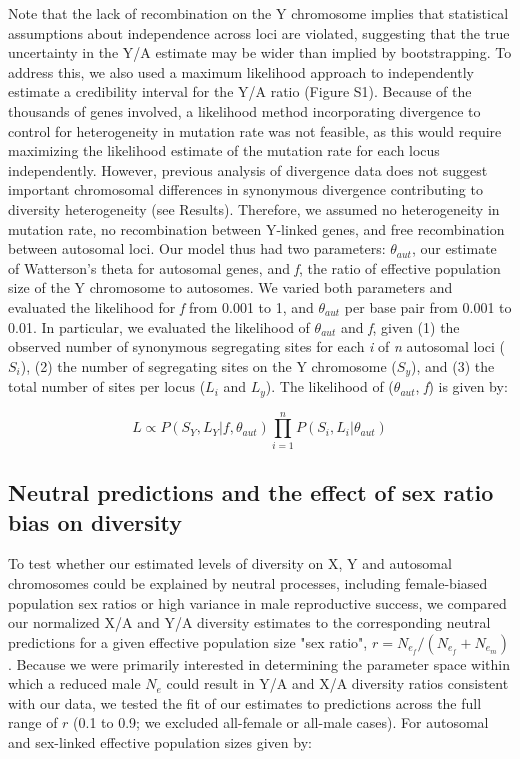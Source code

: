 \documentclass[9pt,twocolumn,twoside,lineno]{gsajnl}
\begin{document}
Note that the lack of recombination on the Y chromosome implies that statistical assumptions about independence across loci are violated, suggesting that the true uncertainty in the Y/A estimate may be wider than implied by bootstrapping. To address this, we also used a maximum likelihood approach \citep{wright2004hka} to independently estimate a credibility interval for the Y/A ratio (Figure S1). Because of the thousands of genes involved, a likelihood method incorporating divergence to control for heterogeneity in mutation rate was not feasible, as this would require maximizing the likelihood estimate of the mutation rate for each locus independently. However, previous analysis of divergence data does not suggest important chromosomal differences in synonymous divergence contributing to diversity heterogeneity (see Results). Therefore, we assumed no heterogeneity in mutation rate, no recombination between Y-linked genes, and free recombination between autosomal loci. Our model thus had two parameters: $\theta_{aut}$, our estimate of Watterson's theta for autosomal genes, and \textit{f}, the ratio of effective population size of the Y chromosome to autosomes. We varied both parameters and evaluated the likelihood for \textit{f} from 0.001 to 1, and $\theta_{aut}$ per base pair from 0.001 to 0.01. In particular, we evaluated the likelihood of $\theta_{aut}$ and \textit{f}, given (1) the observed number of synonymous segregating sites for each \textit{i} of \textit{n} autosomal loci ($S_{i}$), (2) the number of segregating sites on the Y chromosome ($S_{y}$), and (3) the total number of sites per locus ($L_{i}$ and $L_{y}$). The likelihood of ($\theta_{aut}$, \textit{f}) is given by:

\begin{equation}
  L \propto  P(S_{Y}, L_{Y} | f, \theta_{aut})\prod_{i=1}^{n}P(S_{i}, L_{i} | \theta_{aut}) \label{eq:L}
\end{equation}

\subsection*{Neutral predictions and the effect of sex ratio bias on diversity}
To test whether our estimated levels of diversity on X, Y and autosomal chromosomes could be explained by neutral processes, including female-biased population sex ratios or high variance in male reproductive success, we compared our normalized X/A and Y/A diversity estimates to the corresponding neutral predictions for a given effective population size "sex ratio", $r=N_{e_{f}}/(N_{e_{f}} + N_{e_{m}})$. Because we were primarily interested in determining the parameter space within which a reduced male $N_{e}$ could result in Y/A and X/A diversity ratios consistent with our data, we tested the fit of our estimates to predictions across the full range of $r$ (0.1 to 0.9; we excluded all-female or all-male cases). For autosomal and sex-linked effective population sizes given by:
\end{document}
